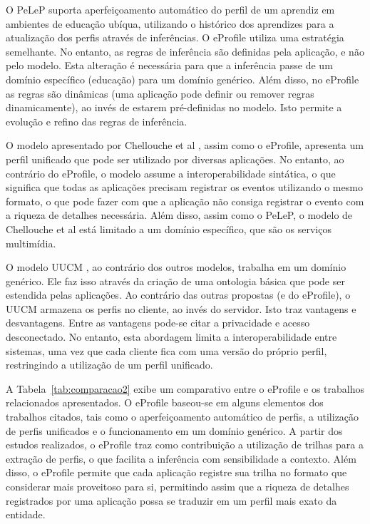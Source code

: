 \documentclass[times, 10pt, twocolumn]{article}
\begin{document}

O PeLeP \cite{pelep} suporta aperfeiçoamento automático do perfil de um aprendiz em ambientes de educação ubíqua, utilizando o histórico dos aprendizes para a atualização dos perfis através de inferências. O eProfile utiliza uma estratégia semelhante. No entanto, as regras de inferência são definidas pela aplicação, e não pelo modelo. Esta alteração é necessária para que a inferência passe de um domínio específico (educação) para um domínio genérico. Além disso, no eProfile as regras são dinâmicas (uma aplicação pode definir ou remover regras dinamicamente), ao invés de estarem pré-definidas no modelo. Isto permite a evolução e refino das regras de inferência.

O modelo apresentado por Chellouche et al \cite{chellouche10}, assim como o eProfile, apresenta um perfil unificado que pode ser utilizado por diversas aplicações. No entanto, ao contrário do eProfile, o modelo assume a interoperabilidade sintática, o que significa que todas as aplicações precisam registrar os eventos utilizando o mesmo formato, o que pode fazer com que a aplicação não consiga registrar o evento com a riqueza de detalhes necessária. Além disso, assim como o PeLeP, o modelo de Chellouche et al \cite{chellouche10} está limitado a um domínio específico, que são os serviços multimídia.

O modelo UUCM \cite{niederee04}, ao contrário dos outros modelos, trabalha em um domínio genérico. Ele faz isso através da criação de uma ontologia básica que pode ser estendida pelas aplicações. Ao contrário das outras propostas (e do eProfile), o UUCM armazena os perfis no cliente, ao invés do servidor. Isto traz vantagens e desvantagens. Entre as vantagens pode-se citar a privacidade e acesso desconectado. No entanto, esta abordagem limita a interoperabilidade entre sistemas, uma vez que cada cliente fica com uma versão do próprio perfil, restringindo a utilização de um perfil unificado.

A Tabela~\ref{tab:comparacao2} exibe um comparativo entre o eProfile e os trabalhos relacionados apresentados. O eProfile baseou-se em alguns elementos dos trabalhos citados, tais como o aperfeiçoamento automático de perfis, a utilização de perfis unificados e o funcionamento em um domínio genérico. A partir dos estudos realizados, o eProfile traz como contribuição a utilização de trilhas para a extração de perfis, o que facilita a inferência com sensibilidade a contexto. Além disso, o eProfile permite que cada aplicação registre sua trilha no formato que considerar mais proveitoso para si, permitindo assim que a riqueza de detalhes registrados por uma aplicação possa se traduzir em um perfil mais exato da entidade.
\end{document}
